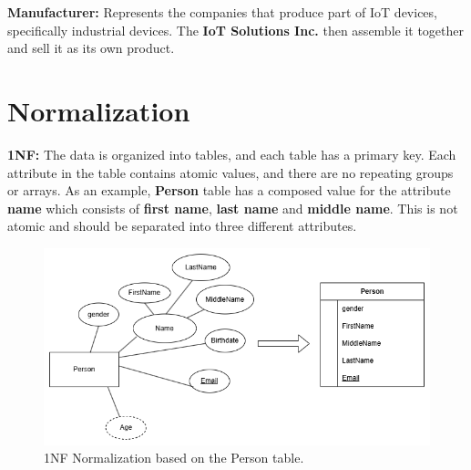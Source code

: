 \documentclass{article}
\begin{document}
\textbf{Manufacturer:}
Represents the companies that produce part of IoT devices, specifically industrial devices. The \textbf{IoT Solutions Inc. } then assemble it together and sell it as its own product. 


\newpage
\section{Normalization}
\textbf{1NF:} The data is organized into tables, and each table has a primary key. Each attribute in the table contains atomic values, and there are no repeating groups or arrays. As an example, \textbf{Person} table has a composed value for the attribute \textbf{name} which consists of \textbf{first name}, \textbf{last name} and \textbf{middle name}. This is not atomic and should be separated into three different attributes.
\begin{figure}[H]
\centering
\includegraphics[width=\linewidth]{img/1nf.png}
\caption{1NF Normalization based on the Person table.}
\end{figure}
\end{document}
